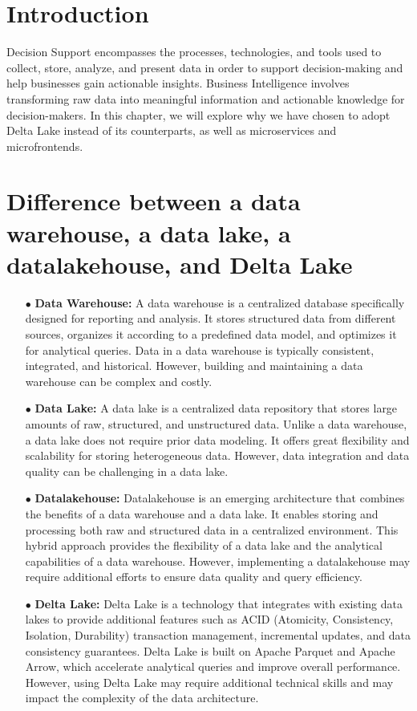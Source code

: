 
\section*{Introduction}

Decision Support encompasses the processes, technologies, and tools used to collect, store, analyze, and present data in order to support decision-making and help businesses gain actionable insights. Business Intelligence involves transforming raw data into meaningful information and actionable knowledge for decision-makers. In this chapter, we will explore why we have chosen to adopt Delta Lake instead of its counterparts, as well as microservices and microfrontends.

\section{Difference between a data warehouse, a data lake, a datalakehouse, and Delta Lake}
\begin{enumerate}
\item[$\bullet$] \textbf{Data Warehouse:} A data warehouse is a centralized database specifically designed for reporting and analysis. It stores structured data from different sources, organizes it according to a predefined data model, and optimizes it for analytical queries. Data in a data warehouse is typically consistent, integrated, and historical. However, building and maintaining a data warehouse can be complex and costly.
\item[$\bullet$] \textbf{Data Lake:} A data lake is a centralized data repository that stores large amounts of raw, structured, and unstructured data. Unlike a data warehouse, a data lake does not require prior data modeling. It offers great flexibility and scalability for storing heterogeneous data. However, data integration and data quality can be challenging in a data lake.
\item[$\bullet$] \textbf{Datalakehouse:} Datalakehouse is an emerging architecture that combines the benefits of a data warehouse and a data lake. It enables storing and processing both raw and structured data in a centralized environment. This hybrid approach provides the flexibility of a data lake and the analytical capabilities of a data warehouse. However, implementing a datalakehouse may require additional efforts to ensure data quality and query efficiency.
\item[$\bullet$] \textbf{Delta Lake:} Delta Lake is a technology that integrates with existing data lakes to provide additional features such as ACID (Atomicity, Consistency, Isolation, Durability) transaction management, incremental updates, and data consistency guarantees. Delta Lake is built on Apache Parquet and Apache Arrow, which accelerate analytical queries and improve overall performance. However, using Delta Lake may require additional technical skills and may impact the complexity of the data architecture.
\end{enumerate}

